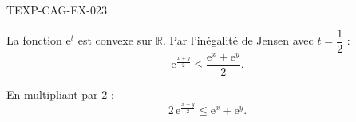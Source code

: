 \begin{corrige}{TEXP-CAG-EX-023}

La fonction $\mathrm{e}^t$ est convexe sur $\mathbb{R}$. Par l'inégalité de Jensen avec $t = \dfrac{1}{2}$ :
\[ \mathrm{e}^{\frac{x+y}{2}} \leq \frac{\mathrm{e}^x + \mathrm{e}^y}{2}. \]


En multipliant par $2$ :
\[ 2\,\mathrm{e}^{\frac{x+y}{2}} \leq \mathrm{e}^x + \mathrm{e}^y. \]

\end{corrige}
